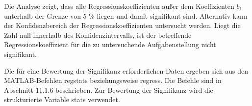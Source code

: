 \begin{table}[H]
{\begin{tabular}{| c | c | c | c | c | c |}
\parbox[c][0.3in][c]{0.95in}{} &
\parbox[c][0.3in][c]{0.95in}{} &
\parbox[c][0.3in][c]{0.95in}{} &
\parbox[c][0.3in][c]{0.95in}{} &
\parbox[c][0.3in][c]{0.95in}{} &
\parbox[c][0.3in][c]{0.95in}{}\\ \hline

\end{tabular}%
}
\label{tab:twelveten}
\end{table}

\noindent Die Analyse zeigt, dass alle Regressionskoeffizienten au{\ss}er dem Koeffizienten $b_{1}$ unterhalb der Grenze von 5 \% liegen und damit signifikant sind. Alternativ kann der Konfidenzbereich der Regressionskoeffizienten untersucht werden. Liegt die Zahl null innerhalb des Konfidenzintervalls, ist der betreffende Regressionskoeffizient f\"{u}r die zu untersuchende Aufgabenstellung nicht signifikant.\newline

\noindent Die f\"{u}r eine Bewertung der Signifikanz erforderlichen Daten ergeben sich aus den MATLAB-Befehlen regstats beziehungsweise regress. Die Befehle sind in Abschnitt 11.1.6 beschrieben. Zur Bewertung der Signifikanz wird die strukturierte Variable stats verwendet.



